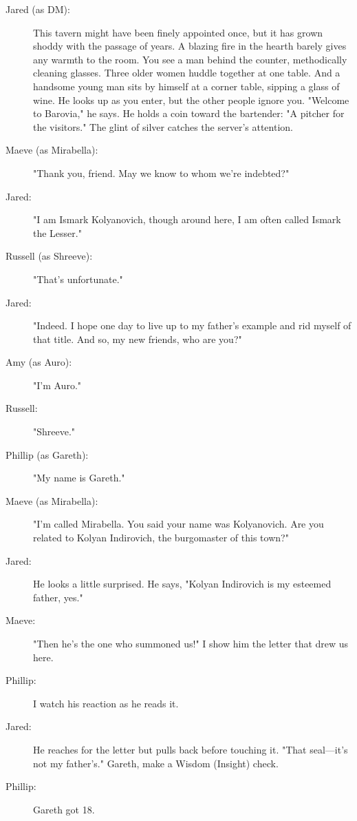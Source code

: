 \documentclass[10pt,a4paper,twoside,bg=print,twocolumn,openany,nodeprecatedcode]{dndbook}
\begin{document}
\begin{description}
\item[Jared (as DM):]
This tavern might have been finely appointed once, but it has grown shoddy with the passage of years. A blazing fire in the hearth barely gives any warmth to the room. You see a man behind the counter, methodically cleaning glasses. Three older women huddle together at one table. And a handsome young man sits by himself at a corner table, sipping a glass of wine. He looks up as you enter, but the other people ignore you. "Welcome to Barovia," he says. He holds a coin toward the bartender: "A pitcher for the visitors." The glint of silver catches the server's attention.
\item[Maeve (as Mirabella):]
"Thank you, friend. May we know to whom we're indebted?"
\item[Jared:]
"I am Ismark Kolyanovich, though around here, I am often called Ismark the Lesser."
\item[Russell (as Shreeve):]
"That's unfortunate."
\item[Jared:]
"Indeed. I hope one day to live up to my father's example and rid myself of that title. And so, my new friends, who are you?"
\item[Amy (as Auro):]
"I'm Auro."
\item[Russell:]
"Shreeve."
\item[Phillip (as Gareth):]
"My name is Gareth."
\item[Maeve (as Mirabella):]
"I'm called Mirabella. You said your name was Kolyanovich. Are you related to Kolyan Indirovich, the burgomaster of this town?"
\item[Jared:]
He looks a little surprised. He says, "Kolyan Indirovich is my esteemed father, yes."
\item[Maeve:]
"Then he's the one who summoned us!" I show him the letter that drew us here.
\item[Phillip:]
I watch his reaction as he reads it.
\end{description}

{\par \vspace { 9pt plus 3pt minus 3pt } \noindent  {} \nopagebreak }

\begin{description}
\item[Jared:]
He reaches for the letter but pulls back before touching it. "That seal—it's not my father's." Gareth, make a Wisdom (Insight) check.
\item[Phillip:]
Gareth got 18.
\end{description}
\end{document}

